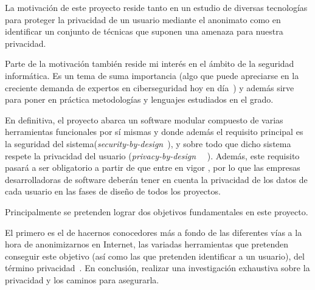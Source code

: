 La motivación de este proyecto reside tanto en un estudio de diversas
tecnologías para proteger la privacidad de un usuario mediante el
anonimato como en identificar un conjunto de técnicas que suponen una
amenaza para nuestra privacidad.
 
Parte de la motivación también reside mi interés en el ámbito de la
seguridad informática. Es un tema de suma importancia (algo que puede
apreciarse en la creciente demanda de expertos en ciberseguridad hoy
en día~\cite{article:expCiberseguridad}) y además sirve para poner en
práctica metodologías y lenguajes estudiados en el grado.

En definitiva, el proyecto abarca un software modular compuesto de
varias herramientas funcionales por sí mismas y donde además el
requisito principal es la seguridad del
sistema(\textit{security-by-design}~\cite{paper:secbydesign}), y sobre
todo que dicho sistema respete la privacidad del usuario
(\textit{privacy-by-design}~\cite{paper:privacybydesign}
~\cite{cavoukian2009privacy}). Además, este requisito pasará a ser
obligatorio a partir de que entre en vigor  , por
lo que las empresas desarrolladoras de software deberán tener en
cuenta la privacidad de los datos de cada usuario en las fases de
diseño de todos los proyectos.



Principalmente se pretenden lograr dos objetivos fundamentales en este proyecto.

El primero es el de hacernos conocedores más a fondo de las diferentes
vías a la hora de anonimizarnos en Internet, las variadas herramientas
que pretenden conseguir este objetivo (así como las que pretenden
identificar a un usuario),  del término
privacidad~\cite{article:danezis2010}.  En conclusión,  realizar una investigación exhaustiva sobre
la  privacidad y los caminos para
asegurarla.

